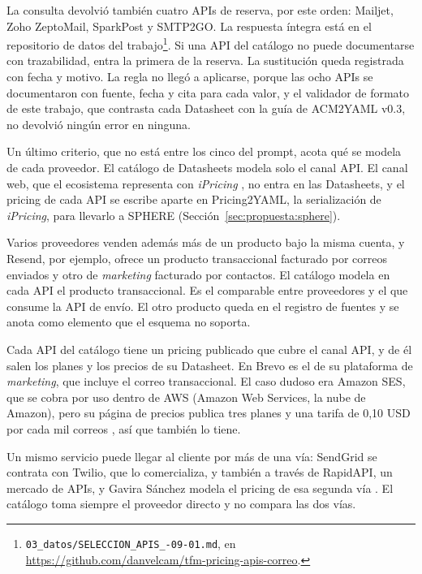 \label{sec:propuesta:reserva}
La consulta devolvió también cuatro APIs de reserva, por este orden: Mailjet, Zoho ZeptoMail, SparkPost y SMTP2GO.
La respuesta íntegra está en el repositorio de datos del trabajo\footnote{\texttt{03\_datos/\allowbreak SELECCION\_APIS\_-09-01.md}, en \url{https://github.com/danvelcam/tfm-pricing-apis-correo}.}.
Si una API del catálogo no puede documentarse con trazabilidad, entra la primera de la reserva.
La sustitución queda registrada con fecha y motivo.
La regla no llegó a aplicarse, porque las ocho APIs se documentaron con fuente, fecha y cita para cada valor, y el validador de formato de este trabajo, que contrasta cada Datasheet con la guía de ACM2YAML v0.3, no devolvió ningún error en ninguna.

Un último criterio, que no está entre los cinco del prompt, acota qué se modela de cada proveedor.
El catálogo de Datasheets modela solo el canal API.
El canal web, que el ecosistema representa con \textit{iPricing} \citep{garciafernandez2025ipricing}, no entra en las Datasheets, y el pricing de cada API se escribe aparte en Pricing2YAML, la serialización de \textit{iPricing}, para llevarlo a SPHERE (Sección~\ref{sec:propuesta:sphere}).

Varios proveedores venden además más de un producto bajo la misma cuenta, y Resend, por ejemplo, ofrece un producto transaccional facturado por correos enviados y otro de \textit{marketing} facturado por contactos.
El catálogo modela en cada API el producto transaccional.
Es el comparable entre proveedores y el que consume la API de envío.
El otro producto queda en el registro de fuentes y se anota como elemento que el esquema no soporta.

Cada API del catálogo tiene un pricing publicado que cubre el canal API, y de él salen los planes y los precios de su Datasheet.
En Brevo es el de su plataforma de \textit{marketing}, que incluye el correo transaccional.
El caso dudoso era Amazon SES, que se cobra por uso dentro de AWS (Amazon Web Services, la nube de Amazon), pero su página de precios publica tres planes y una tarifa de 0,10 USD por cada mil correos \citep{sespricing}, así que también lo tiene.

Un mismo servicio puede llegar al cliente por más de una vía: SendGrid se contrata con Twilio, que lo comercializa, y también a través de RapidAPI, un mercado de APIs, y Gavira Sánchez modela el pricing de esa segunda vía \citep{gavira2026tfm}.
El catálogo toma siempre el proveedor directo y no compara las dos vías.

